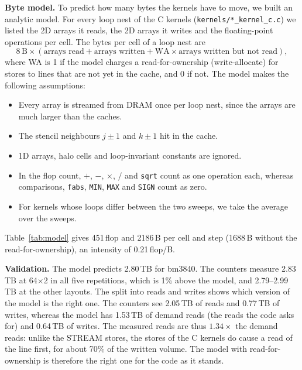 \documentclass[a4paper,11pt]{article}
\newcommand{\kernel}[1]{\texttt{#1}}
\begin{document}
\textbf{Byte model.} To predict how many bytes the kernels have to move, we built an analytic model. For every
loop nest of the C kernels (\texttt{kernels/*\_kernel\_c.c}) we listed the 2D arrays it reads, the 2D arrays it
writes and the floating-point operations per cell. The bytes per cell of a loop nest are
\[
  8\,\mathrm{B}\times(\text{arrays read} + \text{arrays written}
  + \text{WA}\times\text{arrays written but not read}),
\]
where WA is 1 if the model charges a read-for-ownership (write-allocate) for stores to lines that are not
yet in the cache, and 0 if not. The model makes the following assumptions:
\begin{itemize}
  \item Every array is streamed from DRAM once per loop nest, since the arrays are much larger than the caches.
  \item The stencil neighbours $j\pm1$ and $k\pm1$ hit in the cache.
  \item 1D arrays, halo cells and loop-invariant constants are ignored.
  \item In the flop count, $+$, $-$, $\times$, $/$ and \texttt{sqrt} count as one operation each, whereas
        comparisons, \texttt{fabs}, \texttt{MIN}, \texttt{MAX} and \texttt{SIGN} count as zero.
  \item For kernels whose loops differ between the two sweeps, we take the average over the sweeps.
\end{itemize}
Table~\ref{tab:model} gives 451\,flop and 2186\,B per cell and
step (1688\,B without the read-for-ownership), an intensity of 0.21\,flop/B.

\begin{table}[htbp]
  \centering\small
  
  \caption{Analytic flop and byte counts per cell and call (WA = write-allocate). \kernel{ideal\_gas} runs
    2.1 times per step.}
  \label{tab:model}
\end{table}

\textbf{Validation.} The model predicts 2.80\,TB for bm3840. The counters measure 2.83\,TB at 64$\times$2 in
all five repetitions, which is 1\% above the model, and 2.79--2.99\,TB at the other layouts. The split into
reads and writes shows which version of the model is the right one. The counters see 2.05\,TB of reads and
0.77\,TB of writes, whereas the model has 1.53\,TB of demand reads (the reads the code asks for) and 0.64\,TB
of writes. The measured reads are thus $1.34\times$ the demand reads: unlike the STREAM stores, the stores of the C
kernels do cause a read of the line first, for about 70\% of the written volume. The model with
read-for-ownership is therefore the right one for the code as it stands.
\end{document}
